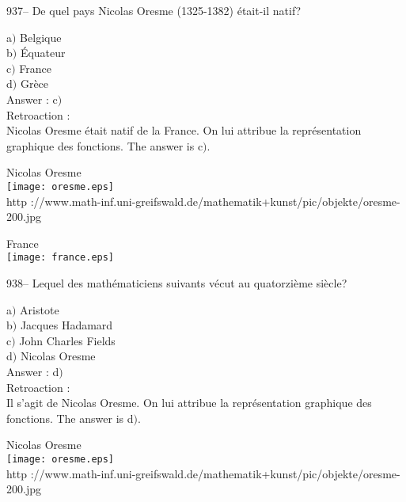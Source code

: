 ﻿\documentclass[letterpaper, 12pt]{article}
\begin{document}
937-- De quel pays Nicolas Oresme (1325-1382) \'etait-il natif?

a$)$ Belgique \\
b$)$ \'Equateur  \\
c$)$ France \\
d$)$ Gr\`ece\\

Answer : c$)$\\

Retroaction : \\
Nicolas Oresme \'etait natif de la France. On lui attribue la
repr\'esentation graphique des fonctions. The answer is c$)$.\\

        \begin{center}
        Nicolas Oresme\\
    \texttt{[image: oresme.eps]}\\
        {\footnotesize http
://www.math-inf.uni-greifswald.de/mathematik+kunst/pic/objekte/oresme-200.jpg}
    \end{center}

        \begin{center}
        France\\
    \texttt{[image: france.eps]}\\
    \end{center}

938-- Lequel des math\'ematiciens suivants v\'ecut au quatorzi\`eme
si\`ecle?

a$)$ Aristote \\
b$)$ Jacques Hadamard \\
c$)$ John Charles Fields \\
d$)$ Nicolas Oresme\\

Answer : d$)$\\

Retroaction :\\
Il s'agit de Nicolas Oresme. On lui attribue la repr\'esentation graphique
des fonctions. The answer is d$)$.\\

        \begin{center}
        Nicolas Oresme\\
    \texttt{[image: oresme.eps]}\\
        {\footnotesize http
://www.math-inf.uni-greifswald.de/mathematik+kunst/pic/objekte/oresme-200.jpg}
    \end{center}
\end{document}
